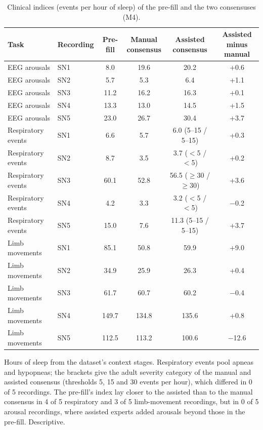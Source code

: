 \begin{table}[h!]
\centering
\footnotesize
\caption{Clinical indices (events per hour of sleep) of the pre-fill and the two consensuses (M4).}
\label{tab:s-indices}
\begin{adjustbox}{max width=\linewidth}
\begin{tabular}{llcccc}
\toprule
Task & Recording & Pre-fill & \makecell{Manual\\consensus} & \makecell{Assisted\\consensus} & \makecell{Assisted minus\\manual} \\
\midrule
EEG arousals & SN1 & 8.0 & 19.6 & 20.2 & +0.6 \\
EEG arousals & SN2 & 5.7 & 5.3 & 6.4 & +1.1 \\
EEG arousals & SN3 & 11.2 & 16.2 & 16.3 & +0.1 \\
EEG arousals & SN4 & 13.3 & 13.0 & 14.5 & +1.5 \\
EEG arousals & SN5 & 23.0 & 26.7 & 30.4 & +3.7 \\
Respiratory events & SN1 & 6.6 & 5.7 & 6.0 (5--15 / 5--15) & +0.3 \\
Respiratory events & SN2 & 8.7 & 3.5 & 3.7 ($<$5 / $<$5) & +0.2 \\
Respiratory events & SN3 & 60.1 & 52.8 & 56.5 ($\ge$30 / $\ge$30) & +3.6 \\
Respiratory events & SN4 & 4.2 & 3.3 & 3.2 ($<$5 / $<$5) & \ensuremath{-}0.2 \\
Respiratory events & SN5 & 15.0 & 7.6 & 11.3 (5--15 / 5--15) & +3.7 \\
Limb movements & SN1 & 85.1 & 50.8 & 59.9 & +9.0 \\
Limb movements & SN2 & 34.9 & 25.9 & 26.3 & +0.4 \\
Limb movements & SN3 & 61.7 & 60.7 & 60.2 & \ensuremath{-}0.4 \\
Limb movements & SN4 & 149.7 & 134.8 & 135.6 & +0.8 \\
Limb movements & SN5 & 112.5 & 113.2 & 100.6 & \ensuremath{-}12.6 \\
\bottomrule
\end{tabular}
\end{adjustbox}
\par\smallskip
\begin{minipage}{0.95\linewidth}\footnotesize Hours of sleep from the dataset's context stages. Respiratory events pool apneas and hypopneas; the brackets give the adult severity category of the manual and assisted consensus (thresholds 5, 15 and 30 events per hour), which differed in 0 of 5 recordings. The pre-fill's index lay closer to the assisted than to the manual consensus in 4 of 5 respiratory and 3 of 5 limb-movement recordings, but in 0 of 5 arousal recordings, where assisted experts added arousals beyond those in the pre-fill. Descriptive.\end{minipage}
\end{table}
